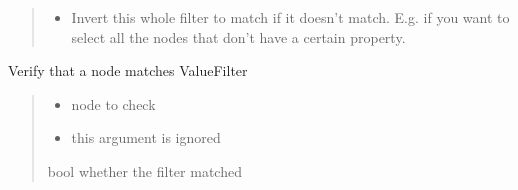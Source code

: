 \documentclass[a4paper,10pt,english]{sphinxmanual}
\begin{document}
\begin{fulllineitems}
\begin{fulllineitems}
\begin{quote}
\begin{description}
\begin{itemize}
\item {}
\sphinxAtStartPar
{} \textendash{} Invert this whole filter to match if it doesn’t match. E.g. if you want to select all the nodes
that don’t have a certain property.

\end{itemize}

\end{description}\end{quote}

\end{fulllineitems}


\begin{fulllineitems}
\label{\detokenize{fagus:fagus.VFil.match_node}}
\pysigstartsignatures
{}
\pysigstopsignatures
\sphinxAtStartPar
Verify that a node matches ValueFilter
\begin{quote}\begin{description}
\begin{itemize}
\item {}
\sphinxAtStartPar
{} \textendash{} node to check

\item {}
\sphinxAtStartPar
\sphinxstyleliteralstrong{\sphinxupquote{\_}} \textendash{} this argument is ignored

\end{itemize}

\sphinxAtStartPar
bool whether the filter matched

\end{description}\end{quote}

\end{fulllineitems}


\begin{fulllineitems}
\label{\detokenize{fagus:fagus.VFil.__module__}}
\pysigstartsignatures
{}
\pysigstopsignatures
\end{fulllineitems}


\end{fulllineitems}
\end{document}
